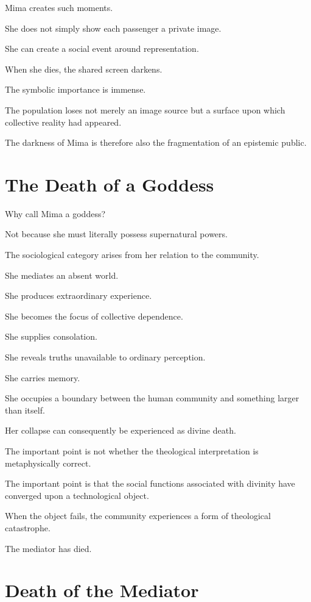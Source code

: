 \documentclass[11pt,oneside]{book}
\theoremstyle{definition}
\theoremstyle{remark}
\begin{document}
Mima creates such moments.

She does not simply show each passenger a private image.

She can create a social event around representation.

When she dies, the shared screen darkens.

The symbolic importance is immense.

The population loses not merely an image source but a surface upon which collective reality had appeared.

The darkness of Mima is therefore also the fragmentation of an epistemic public.

\section{The Death of a Goddess}

Why call Mima a goddess?

Not because she must literally possess supernatural powers.

The sociological category arises from her relation to the community.

She mediates an absent world.

She produces extraordinary experience.

She becomes the focus of collective dependence.

She supplies consolation.

She reveals truths unavailable to ordinary perception.

She carries memory.

She occupies a boundary between the human community and something larger than itself.

Her collapse can consequently be experienced as divine death.

The important point is not whether the theological interpretation is metaphysically correct.

The important point is that the social functions associated with divinity have converged upon a technological object.

When the object fails, the community experiences a form of theological catastrophe.

The mediator has died.

\section{Death of the Mediator}
\end{document}
